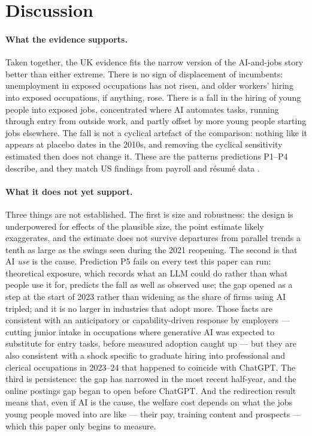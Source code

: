 \documentclass[11pt]{article}
\begin{document}
\section{Discussion}\label{sec:discussion}

\paragraph{What the evidence supports.} Taken together, the UK evidence fits the narrow version of the AI-and-jobs story better than either extreme. There is no sign of displacement of incumbents: unemployment in exposed occupations has not risen, and older workers' hiring into exposed occupations, if anything, rose. There is a fall in the hiring of young people into exposed jobs, concentrated where AI automates tasks, running through entry from outside work, and partly offset by more young people starting jobs elsewhere. The fall is not a cyclical artefact of the comparison: nothing like it appears at placebo dates in the 2010s, and removing the cyclical sensitivity estimated then does not change it. These are the patterns predictions P1--P4 describe, and they match US findings from payroll and r\'esum\'e data \citep{brynjolfsson2025canaries,hosseini2025}.

\paragraph{What it does not yet support.} Three things are not established. The first is size and robustness: the design is underpowered for effects of the plausible size, the point estimate likely exaggerates, and the estimate does not survive departures from parallel trends a tenth as large as the swings seen during the 2021 reopening. The second is that AI \emph{use} is the cause. Prediction P5 fails on every test this paper can run: theoretical exposure, which records what an LLM could do rather than what people use it for, predicts the fall as well as observed use; the gap opened as a step at the start of 2023 rather than widening as the share of firms using AI tripled; and it is no larger in industries that adopt more. Those facts are consistent with an anticipatory or capability-driven response by employers --- cutting junior intake in occupations where generative AI was expected to substitute for entry tasks, before measured adoption caught up --- but they are also consistent with a shock specific to graduate hiring into professional and clerical occupations in 2023--24 that happened to coincide with ChatGPT. The third is persistence: the gap has narrowed in the most recent half-year, and the online postings gap began to open before ChatGPT. And the redirection result means that, even if AI is the cause, the welfare cost depends on what the jobs young people moved into are like --- their pay, training content and prospects --- which this paper only begins to measure.
\end{document}

